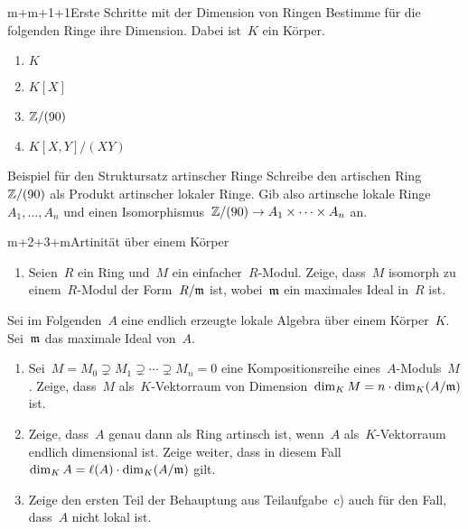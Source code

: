 \documentclass{uebblatt}
\begin{document}

\begin{aufgabe}{m+m+1+1}{Erste Schritte mit der Dimension von Ringen}
Bestimme für die folgenden Ringe ihre Dimension. Dabei ist~$K$ ein Körper.
\begin{enumerate}
\item $K$
\item $K[X]$
\item $\mathbb{Z}/(90)$
\item $K[X,Y]/(XY)$
\end{enumerate}
\end{aufgabe}

\begin{aufgabe}{3}{Beispiel für den Struktursatz artinscher Ringe}
Schreibe den artischen Ring~$\mathbb{Z}/(90)$ als Produkt artinscher lokaler Ringe.
Gib also artinsche lokale Ringe~$A_1,\ldots,A_n$ und einen
Isomorphismus~$\mathbb{Z}/(90) \to A_1 \times \cdots \times A_n$ an.
\end{aufgabe}

\begin{aufgabe}{m+2+3+m}{Artinität über einem Körper}
\begin{enumerate}
\item Seien~$R$ ein Ring und~$M$ ein einfacher~$R$-Modul. Zeige, dass~$M$ isomorph
zu einem~$R$-Modul der Form~$R/\mathfrak{m}$ ist, wobei~$\mathfrak{m}$ ein maximales Ideal in~$R$
ist.
\end{enumerate}
Sei im Folgenden~$A$ eine endlich erzeugte lokale Algebra über einem
Körper~$K$. Sei~$\mathfrak{m}$ das maximale Ideal von~$A$.
\begin{enumerate}
\addtocounter{enumi}{1}
\item Sei~$M = M_0 \supsetneq M_1 \supsetneq \cdots \supsetneq M_n = 0$ eine
Kompositionsreihe eines~$A$-Moduls~$M$. Zeige, dass~$M$ als~$K$-Vektorraum
von Dimension~$\dim_K M = n \cdot \dim_K(A/\mathfrak{m})$ ist.
\item Zeige, dass~$A$ genau dann als Ring artinsch ist, wenn~$A$
als~$K$-Vektorraum endlich dimensional ist. Zeige weiter, dass in diesem
Fall~$\dim_K A = \ell(A) \cdot \dim_K(A/\mathfrak{m})$ gilt.
\item Zeige den ersten Teil der Behauptung aus Teilaufgabe~c) auch für den
Fall, dass~$A$ nicht lokal ist.
\end{enumerate}
\end{aufgabe}
\end{document}
